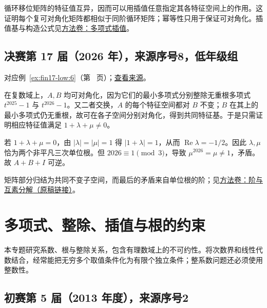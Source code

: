 \documentclass[UTF8,12pt,a4paper,fontset=fandol]{ctexart}
\begin{document}
\begin{remark}[方法与条件]

循环移位矩阵的特征值互异，因而可以用插值任意指定其各特征空间上的作用。这证明每个复可对角化矩阵都相似于同阶循环矩阵；幂等性只用于保证可对角化。插值基与构造公式见\hyperref[app:algebra-interpolation]{方法卷：多项式插值}。

\end{remark}

\subsection{决赛第 17 届（2026 年），来源序号8，低年级组}\label{ans:fin17-low:6}\label{pr:fin17-low:6}

对应例~\ref{ex:fin17-low:6}（第~\pageref{ex:fin17-low:6} 页）；\href{https://github.com/lzxcr/cmc-mathematics/blob/64916fa1fdbc3e444a652eca204d5669058ee321/src/problems/finals/17/08.md}{查看来源}。

\begin{solve}

在复数域上，$A,B$ 均可对角化，因为它们的最小多项式分别整除无重根多项式 $t^{2025}-1$ 与 $t^{2026}-1$。又二者交换，$A$ 的每个特征空间都对 $B$ 不变；$B$ 在其上的最小多项式仍无重根，故可在各子空间分别对角化，得到共同特征基。于是只需证明相应特征值满足 $1+\lambda+\mu\ne0$。

若 $1+\lambda+\mu=0$，由 $|\lambda|=|\mu|=1$ 得 $|1+\lambda|=1$，从而 $\operatorname{Re}\lambda=-1/2$。因此 $\lambda,\mu$ 恰为两个非平凡三次单位根。但 $2026\equiv1\pmod3$，导致 $\mu^{2026}=\mu\ne1$，矛盾。故 $A+B+I$ 可逆。

矩阵部分归结为共同不变子空间，而最后的矛盾来自单位根的阶；见\href{https://github.com/lzxcr/cmc-mathematics/blob/64916fa1fdbc3e444a652eca204d5669058ee321/src/methods/outer/01-algebra.md}{方法卷：阶与互素分解（原稿链接）}。

\end{solve}

\section{多项式、整除、插值与根的约束}

\label{sec:solutions-4}

本专题研究系数、根与整除关系，包含有理数域上的不可约性。将次数界和线性代数结合，经常能把无穷多个取值条件化为有限个独立条件；整系数问题还必须使用整数性。

\subsection{初赛第 5 届（2013 年度），来源序号2}\label{ans:pre05-math:2}\label{pr:pre05-math:2}
\end{document}
